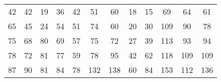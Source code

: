 \documentclass[11pt, a4paper]{article}
\begin{document}
\begin{enumerate}
	\begin{table}[h]
	\def\arraystretch{1.5}
	
	\begin{center}
	\begin{tabular}{|cccccccccccc|}
	
	\hline
	
	42 & 42 & 19 & 36 & 42 & 51 & 60 & 18 & 15 & 69 & 64 & 61 \\
	
	65 & 45 & 24 & 54 & 51 & 74 & 60 & 20 & 30 & 109 & 90 & 78 \\
	
	75 & 68 & 80 & 69 & 57 & 75 & 72 & 27 & 39 & 113 & 93 & 94 \\
	
	78 & 72 & 81 & 77 & 59 & 78 & 95 & 42 & 62 & 118 & 109 & 109 \\
	
	87 & 90 & 81 & 84 & 78 & 132 & 138 & 60 & 84 & 153 & 112 & 136 \\
	
	\hline
	
	\end{tabular}
	\end{center}
	
	\end{table}
\end{enumerate}
\end{document}
